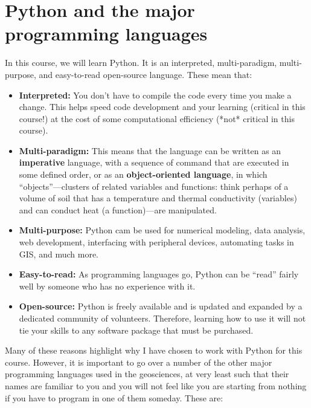 \documentclass[a4paper,10pt]{amsart}
\begin{document}
\section{Python and the major programming languages}

In this course, we will learn Python. It is an interpreted, multi-paradigm, multi-purpose, and easy-to-read open-source language. These mean that:
\begin{itemize}
 \item \textbf{Interpreted:} You don't have to compile the code every time you make a change. This helps speed code development and your learning (critical in this course!) at the cost of some computational efficiency (*not* critical in this course).
 \item \textbf{Multi-paradigm:} This means that the language can be written as an \textbf{imperative} language, with a sequence of command that are executed in some defined order, or as an \textbf{object-oriented language}, in which ``objects''---clusters of related variables and functions: think perhaps of a volume of soil that has a temperature and thermal conductivity (variables) and can conduct heat (a function)---are manipulated.
 \item \textbf{Multi-purpose:} Python cam be used for numerical modeling, data analysis, web development, interfacing with peripheral devices, automating tasks in GIS, and much more.
 \item \textbf{Easy-to-read:} As programming languages go, Python can be ``read'' fairly well by someone who has no experience with it.
 \item \textbf{Open-source:} Python is freely available and is updated and expanded by a dedicated community of volunteers. Therefore, learning how to use it will not tie your skills to any software package that must be purchased.
\end{itemize}
Many of these reasons highlight why I have chosen to work with Python for this course. However, it is important to go over a number of the other major programming languages used in the geosciences, at very least such that their names are familiar to you and you will not feel like you are starting from nothing if you have to program in one of them someday. These are:
\end{document}
